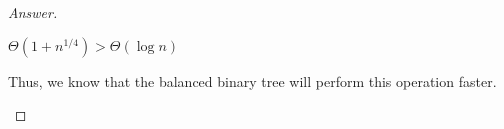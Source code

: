 \documentclass[11pt]{article}
\theoremstyle{definition}
\theoremstyle{definition}
\theoremstyle{definition}
\begin{document}
\begin{enumerate}[label=(\alph*)]
\begin{proof}[Answer]
\begin{itemize}
\begin{center}
$\Theta(1+n^{1/4}) > \Theta(\log n)$
\end{center}
Thus, we know that the balanced binary tree will perform this operation faster.
        \end{itemize}
    \end{proof}
    \end{enumerate}


\end{document}
